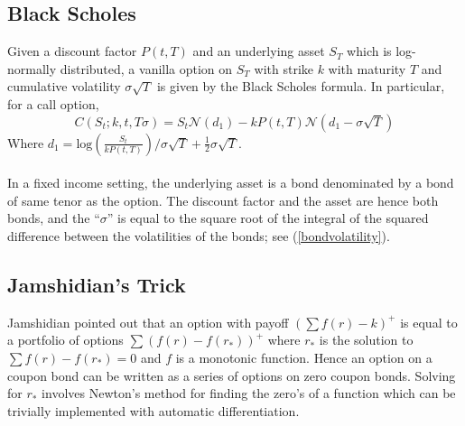 \documentclass{article}
\theoremstyle{definition}
\begin{document}
\subsection{Black Scholes} \label{BS}
  Given a discount factor \(P(t, T)\) and an underlying asset \(S_T\) which is log-normally distributed, a vanilla option on \(S_T\) with strike \(k\) with maturity \(T\) and cumulative volatility \(\sigma \sqrt{T}\) is given by the Black Scholes formula.  In particular, for a call option,
  \[C(S_t; k, t, T \sigma)=S_t \mathcal{N}(d_1)-kP(t, T)\mathcal{N}(d_1-\sigma \sqrt{T})\]
  Where \(d_1=\mathrm{log}\left(\frac{S_t}{kP(t, T)}\right)/\sigma \sqrt{T}+\frac{1}{2}\sigma \sqrt{T}\).
  \\
  \\
  In a fixed income setting, the underlying asset is a bond denominated by a bond of same tenor as the option.  The discount factor and the asset are hence both bonds, and the ``\(\sigma\)'' is equal to the square root of the integral of the squared difference between the volatilities of the bonds; see (\ref{bondvolatility}). 
  
  
\subsection{Jamshidian's Trick} \label{Jamshidian}

Jamshidian pointed out that an option with payoff \(\left(\sum f(r) -k\right)^+\) is equal to a portfolio of options \(\sum (f(r)-f(r_*))^+\) where \(r_*\) is the solution to \(\sum f(r)-f(r_*)=0\) and \(f\) is a monotonic function. Hence an option on a coupon bond can be written as a series of options on zero coupon bonds.   Solving for \(r_*\) involves Newton's method for finding the zero's of a function which can be trivially implemented with automatic differentiation.  
\end{document}
